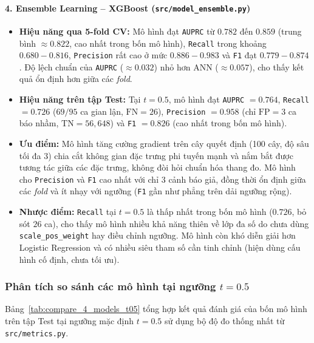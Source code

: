 \paragraph{4. Ensemble Learning -- XGBoost (\texttt{src/model\_ensemble.py})}\mbox{}
\begin{itemize}
    \item \textbf{Hiệu năng qua 5-fold CV:} Mô hình đạt \texttt{AUPRC} từ $0.782$ đến $0.859$ (trung bình $\approx 0.822$, cao nhất trong bốn mô hình), \texttt{Recall} trong khoảng $0.680 - 0.816$, \texttt{Precision} rất cao ở mức $0.886 - 0.983$ và \texttt{F1} đạt $0.779 - 0.874$. Độ lệch chuẩn của \texttt{AUPRC} ($\approx 0.032$) nhỏ hơn ANN ($\approx 0.057$), cho thấy kết quả ổn định hơn giữa các \textit{fold}.
    \item \textbf{Hiệu năng trên tập Test:} Tại $t = 0.5$, mô hình đạt \texttt{AUPRC} $= 0.764$, \texttt{Recall} $= 0.726$ ($69/95$ ca gian lận, $\text{FN} = 26$), \texttt{Precision} $= 0.958$ (chỉ $\text{FP} = 3$ ca báo nhầm, $\text{TN} = 56{,}648$) và \texttt{F1} $= 0.826$ (cao nhất trong bốn mô hình).
    \item \textbf{Ưu điểm:} Mô hình tăng cường gradient trên cây quyết định (100 cây, độ sâu tối đa $3$) chia cắt không gian đặc trưng phi tuyến mạnh và nắm bắt được tương tác giữa các đặc trưng, không đòi hỏi chuẩn hóa thang đo. Mô hình cho \texttt{Precision} và \texttt{F1} cao nhất với chỉ $3$ cảnh báo giả, đồng thời ổn định giữa các \textit{fold} và ít nhạy với ngưỡng (\texttt{F1} gần như phẳng trên dải ngưỡng rộng).
    \item \textbf{Nhược điểm:} \texttt{Recall} tại $t = 0.5$ là thấp nhất trong bốn mô hình ($0.726$, bỏ sót $26$ ca), cho thấy mô hình nhiều khả năng thiên về lớp đa số do chưa dùng \texttt{scale\_pos\_weight} hay điều chỉnh ngưỡng. Mô hình còn khó diễn giải hơn Logistic Regression và có nhiều siêu tham số cần tinh chỉnh (hiện dùng cấu hình cố định, chưa tối ưu).
\end{itemize}

\subsubsection{Phân tích so sánh các mô hình tại ngưỡng $t = 0.5$}

Bảng~\ref{tab:compare_4_models_t05} tổng hợp kết quả đánh giá của bốn mô hình trên tập Test tại ngưỡng mặc định $t = 0.5$ sử dụng bộ độ đo thống nhất từ \texttt{src/metrics.py}.

